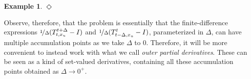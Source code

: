 \documentclass[10pt,a4paper]{paper}
\theoremstyle{definition}
\newtheorem{exmp}{Example}%
\newcommand{\nats}{\mathbb{N}}
\newcommand{\reals}{\mathbb{R}}
\newcommand{\realspos}{\reals_{>0}}
\newcommand{\realsnonneg}{\reals_{\geq 0}}
\newcommand{\states}{\mathcal{X}}
\newcommand{\processes}{\mathbb{P}}
\newcommand{\wprocesses}{\processes^{\mathrm{W}}}
\newcommand{\wmprocesses}{\processes^{\mathrm{WM}}}
\newcommand{\norm}[1]{\left\lVert #1 \right\rVert}
\newcommand{\coloneqq}{:\!=}
\newcommand{\exampleend}{\hfill$\Diamond$}
\begin{document}
\begin{exmp}
%
%
\exampleend
\end{exmp}

Observe, therefore, that the problem is essentially that the finite-difference expressions $\nicefrac{1}{\Delta}(T_{t,x_u}^{t+\Delta} - I)$ and $\nicefrac{1}{\Delta}(T_{t-\Delta,x_u}^{t} - I)$, parameterized in $\Delta$, can have multiple accumulation points as we take $\Delta$ to $0$. Therefore, it will be more convenient to instead work with what we call \emph{outer partial derivatives}. These can be seen as a kind of set-valued derivatives, containing all these accumulation points obtained as $\Delta\to0^+$.
\end{document}
